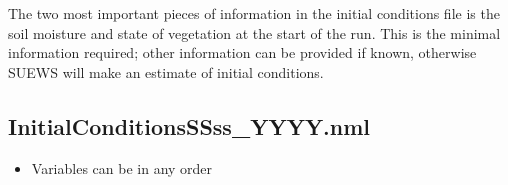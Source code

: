 \documentclass[letterpaper,10pt,english]{sphinxmanual}
\begin{document}
The two most important pieces of information in the initial conditions
file is the soil moisture and state of vegetation at the start of the
run. This is the minimal information required; other information can be
provided if known, otherwise SUEWS will make an estimate of initial
conditions.


\subsection{InitialConditionsSSss\_YYYY.nml}
\label{\detokenize{input_files/Initial_Conditions:initialconditionsssss-yyyy-nml}}\begin{itemize}
\item {} 
Variables can be in any order

\end{itemize}
\end{document}
